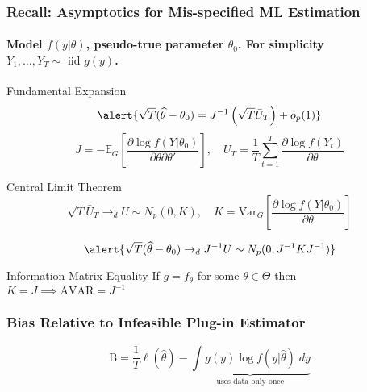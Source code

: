 \begin{frame}
  \frametitle{Recall: Asymptotics for Mis-specified ML Estimation}
  \framesubtitle{Model $f(y|\theta)$, pseudo-true parameter $\theta_0$. For simplicity $Y_1, \dots, Y_T \sim \mbox{ iid } g(y)$.}

  \pause

  \begin{block}{Fundamental Expansion}
    \vspace{-1.5em}
  \[
    \alert{\sqrt{T} ( \widehat{\theta} - \theta_0)   = J^{-1}\left(\sqrt{T} \bar{U}_T\right) + o_p(1)}
  \]
  \footnotesize
\[
      J = -\mathbb{E}_G \left[ \frac{\partial \log f(Y|\theta_0)}{\partial \theta \partial \theta'} \right], \quad
      \bar{U}_T =\frac{1}{T} \sum_{t=1}^T \frac{\partial \log f(Y_t)}{\partial \theta}
\] 
\end{block}

\normalsize

\vspace{-1em}

\pause

\begin{block}{Central Limit Theorem}
  \vspace{-1em}
  \footnotesize
  \[
    \sqrt{T} \bar{U}_T \rightarrow_d U \sim N_p(0, K), \quad
    K = \text{Var}_G\left[\frac{\partial \log f(Y|\theta_0)}{\partial \theta}\right]
  \] 
  \normalsize

  \vspace{-1em}

  \[
    \alert{\sqrt{T}(\widehat{\theta} - \theta_0) \rightarrow_d J^{-1}U \sim N_p(0, J^{-1}KJ^{-1})}
  \]
\end{block}

\vspace{-1em}

\pause

\begin{block}{Information Matrix Equality}
  If $g = f_\theta$ for some $\theta \in \Theta$ then $K = J \implies \text{AVAR} = J^{-1}$
\end{block}

\end{frame}
\begin{frame}
  \frametitle{Bias Relative to Infeasible Plug-in Estimator}

  \[
    \text{B} = \frac{1}{T} \ell(\widehat{\theta}) - \underbrace{\int g(y) \log f(y|\widehat{\theta})\; dy}_{\text{uses data only once}}  
  \]

\end{frame}
